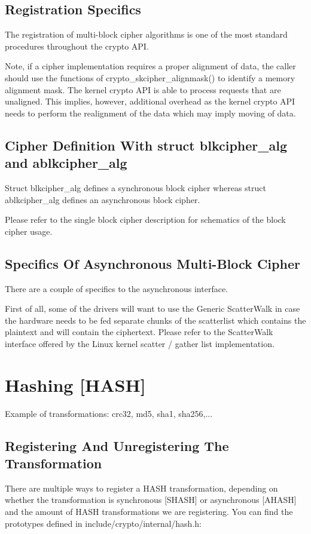 \documentclass[a4paper,8pt,english]{sphinxmanual}
\begin{document}
\subsection{Registration Specifics}
\label{crypto/devel-algos:id1}
The registration of multi-block cipher algorithms is one of the most
standard procedures throughout the crypto API.

Note, if a cipher implementation requires a proper alignment of data,
the caller should use the functions of crypto\_skcipher\_alignmask() to
identify a memory alignment mask. The kernel crypto API is able to
process requests that are unaligned. This implies, however, additional
overhead as the kernel crypto API needs to perform the realignment of
the data which may imply moving of data.


\subsection{Cipher Definition With struct blkcipher\_alg and ablkcipher\_alg}
\label{crypto/devel-algos:cipher-definition-with-struct-blkcipher-alg-and-ablkcipher-alg}
Struct blkcipher\_alg defines a synchronous block cipher whereas struct
ablkcipher\_alg defines an asynchronous block cipher.

Please refer to the single block cipher description for schematics of
the block cipher usage.


\subsection{Specifics Of Asynchronous Multi-Block Cipher}
\label{crypto/devel-algos:specifics-of-asynchronous-multi-block-cipher}
There are a couple of specifics to the asynchronous interface.

First of all, some of the drivers will want to use the Generic
ScatterWalk in case the hardware needs to be fed separate chunks of the
scatterlist which contains the plaintext and will contain the
ciphertext. Please refer to the ScatterWalk interface offered by the
Linux kernel scatter / gather list implementation.


\section{Hashing {[}HASH{]}}
\label{crypto/devel-algos:hashing-hash}
Example of transformations: crc32, md5, sha1, sha256,...


\subsection{Registering And Unregistering The Transformation}
\label{crypto/devel-algos:registering-and-unregistering-the-transformation}
There are multiple ways to register a HASH transformation, depending on
whether the transformation is synchronous {[}SHASH{]} or asynchronous
{[}AHASH{]} and the amount of HASH transformations we are registering. You
can find the prototypes defined in include/crypto/internal/hash.h:
\end{document}
